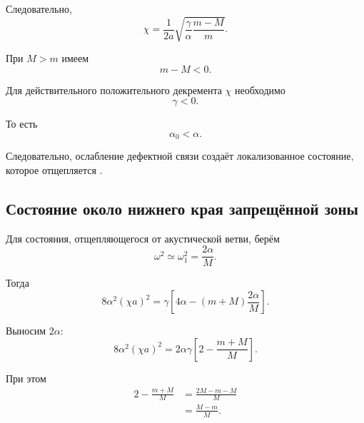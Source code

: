 \documentclass[../final.tex]{subfiles}
\begin{document}
Следовательно,
%
\begin{equation*}
    \chi
    =
    \frac{1}{2a}
    \sqrt{
        \frac{\gamma}{\alpha}
        \frac{m-M}{m}
    }.
\end{equation*}
%

При $M>m$ имеем
%
\begin{equation*}
    m-M<0.
\end{equation*}
%

Для действительного положительного декремента $\chi$
необходимо
%
\begin{equation*}
    \gamma<0.
\end{equation*}
%

То есть
%
\begin{equation*}
    \alpha_0<\alpha.
\end{equation*}
%

Следовательно, ослабление дефектной связи
создаёт локализованное состояние,
которое отщепляется
.



\subsection*{Состояние около нижнего края запрещённой зоны}

Для состояния,
отщепляющегося от акустической ветви,
берём
%
\begin{equation*}
    \omega^2
    \simeq
    \omega_1^2
    =
    \frac{2\alpha}{M}.
\end{equation*}
%

Тогда
%
\begin{equation*}
    8\alpha^2(\chi a)^2
    =
    \gamma
    \left[
        4\alpha
        -
        (m+M)
        \frac{2\alpha}{M}
    \right].
\end{equation*}
%

Выносим $2\alpha$:
%
\begin{equation*}
    8\alpha^2(\chi a)^2
    =
    2\alpha\gamma
    \left[
        2
        -
        \frac{m+M}{M}
    \right].
\end{equation*}
%

При этом
%
\begin{align*}
    2-\frac{m+M}{M}
    &=
    \frac{2M-m-M}{M}
    \\
    &=
    \frac{M-m}{M}.
\end{align*}
%
\end{document}
